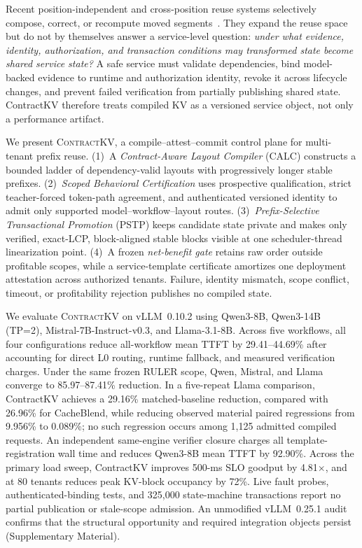 \documentclass[journal]{IEEEtran}
\begin{document}
Recent position-independent and cross-position reuse systems selectively compose, correct, or recompute moved segments~\cite{cacheblend2025,epic2025,cacheslide2026,minipic2026}. They expand the reuse space but do not by themselves answer a service-level question: \emph{under what evidence, identity, authorization, and transaction conditions may transformed state become shared service state?} A safe service must validate dependencies, bind model-backed evidence to runtime and authorization identity, revoke it across lifecycle changes, and prevent failed verification from partially publishing shared state. ContractKV therefore treats compiled KV as a versioned service object, not only a performance artifact.

We present \textsc{ContractKV}, a compile--attest--commit control plane for multi-tenant prefix reuse. (1)~A \emph{Contract-Aware Layout Compiler} (CALC) constructs a bounded ladder of dependency-valid layouts with progressively longer stable prefixes. (2)~\emph{Scoped Behavioral Certification} uses prospective qualification, strict teacher-forced token-path agreement, and authenticated versioned identity to admit only supported model--workflow--layout routes. (3)~\emph{Prefix-Selective Transactional Promotion} (PSTP) keeps candidate state private and makes only verified, exact-LCP, block-aligned stable blocks visible at one scheduler-thread linearization point. (4)~A frozen \emph{net-benefit gate} retains raw order outside profitable scopes, while a service-template certificate amortizes one deployment attestation across authorized tenants. Failure, identity mismatch, scope conflict, timeout, or profitability rejection publishes no compiled state.

We evaluate \textsc{ContractKV} on vLLM~0.10.2 using Qwen3-8B, Qwen3-14B (TP=2), Mistral-7B-Instruct-v0.3, and Llama-3.1-8B. Across five workflows, all four configurations reduce all-workflow mean TTFT by 29.41--44.69\% after accounting for direct L0 routing, runtime fallback, and measured verification charges. Under the same frozen RULER scope, Qwen, Mistral, and Llama converge to 85.97--87.41\% reduction. In a five-repeat Llama comparison, ContractKV achieves a 29.16\% matched-baseline reduction, compared with 26.96\% for CacheBlend, while reducing observed material paired regressions from 9.956\% to 0.089\%; no such regression occurs among 1{,}125 admitted compiled requests. An independent same-engine verifier closure charges all template-registration wall time and reduces Qwen3-8B mean TTFT by 92.90\%. Across the primary load sweep, ContractKV improves 500-ms SLO goodput by 4.81$\times$, and at 80 tenants reduces peak KV-block occupancy by 72\%. Live fault probes, authenticated-binding tests, and 325{,}000 state-machine transactions report no partial publication or stale-scope admission. An unmodified vLLM~0.25.1 audit confirms that the structural opportunity and required integration objects persist (Supplementary Material).
\end{document}
